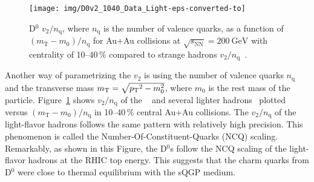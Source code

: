 \begin{figure}[!htb]
\begin{center}
  \texttt{[image: img/D0v2\_1040\_Data\_Light-eps-converted-to]}\\
\end{center}
\caption[D$^0$ $v_2/n_\mathrm{q}$ as a function of $(m_\mathrm{T} - m_0)/n_\mathrm{q}$ for Au+Au collisions.]{\label{dzerov2NCQ}D$^0$ $v_2/n_\mathrm{q}$, where $n_\mathrm{q}$ is the number of valence quarks, as a function of $(m_\mathrm{T} - m_0)/n_\mathrm{q}$ for Au+Au collisions
at $\sqrt{s_\mathrm{NN}} = \SI{200}{\giga\electronvolt}$ with centrality of 10--40$\,\%$ compared to strange hadrons $v_2/n_\mathrm{q}$~\cite{D0v2paper,StrangeAndChargedv2paper}.}
\end{figure}


Another way of parametrizing the $v_2$ is using the number of valence quarks $n_\mathrm{q}$ and the transverse mass $m_\mathrm{T}= \sqrt{{p_{\mathrm{T}}}^2 - m_0^2}$, where $m_0$ is the rest mass of the particle. Figure~\ref{dzerov2NCQ} shows $v_2 / n_\mathrm{q}$ of the \dzero~\cite{D0v2paper} and several lighter hadrons~\cite{StrangeAndChargedv2paper} plotted versus $(m_\mathrm{T} - m_0)/n_\mathrm{q}$ in 10--40$\,\%$ central Au+Au collisions\@. The $v_2/n_\mathrm{q}$ of the light-flavor hadrons follows the same pattern with relatively high precision. This phenomenon is called the Number-Of-Constituent-Quarks (NCQ) scaling. Remarkably, as shown in this Figure, the D$^0$s follow the NCQ scaling of the light-flavor hadrons at the RHIC top energy. This suggests that the charm quarks from D$^0$ were close to thermal equilibrium with the sQGP medium.

% 


